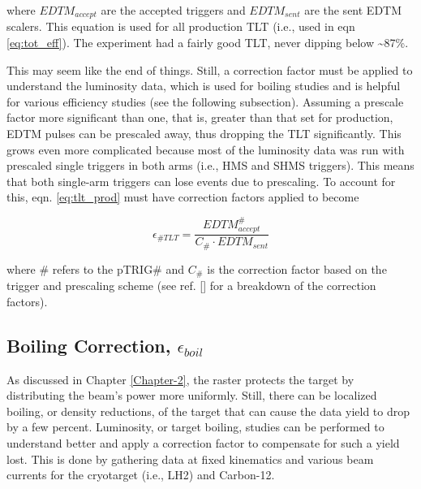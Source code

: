 \documentclass[
]{report}
\begin{document}
\noindent where \(EDTM_{accept}\) are the accepted triggers and
\(EDTM_{sent}\) are the sent EDTM scalers. This equation is used for all
production TLT (i.e., used in eqn \ref{eq:tot_eff}). The experiment had
a fairly good TLT, never dipping below \textasciitilde87\%.



This may seem like the end of things. Still, a correction factor must be
applied to understand the luminosity data, which is used for boiling
studies and is helpful for various efficiency studies (see the following
subsection). Assuming a prescale factor more significant than one, that
is, greater than that set for production, EDTM pulses can be prescaled
away, thus dropping the TLT significantly. This grows even more
complicated because most of the luminosity data was run with prescaled
single triggers in both arms (i.e., HMS and SHMS triggers). This means
that both single-arm triggers can lose events due to prescaling. To
account for this, eqn. \ref{eq:tlt_prod} must have correction factors
applied to become

\begin{equation} 
  \epsilon_{\#TLT}=\frac{EDTM^{\#}_{accept}}{C_{\#}\cdot EDTM_{sent}}
  \label{eq:tlt_prescale} 
\end{equation}

\noindent where \# refers to the pTRIG\# and \(C_{\#}\) is the
correction factor based on the trigger and prescaling scheme (see ref.
{[}\cite{murphy_edtm_2022}{]} for a breakdown of the correction
factors).

\hypertarget{boiling-correction-epsilon_boil}{%
\subsection{\texorpdfstring{Boiling Correction,
\(\epsilon_{boil}\)}{Boiling Correction, \textbackslash epsilon\_\{boil\}}}\label{boiling-correction-epsilon_boil}}

As discussed in Chapter \ref{Chapter-2}, the raster protects the target
by distributing the beam's power more uniformly. Still, there can be
localized boiling, or density reductions, of the target that can cause
the data yield to drop by a few percent. Luminosity, or target boiling,
studies can be performed to understand better and apply a correction
factor to compensate for such a yield lost. This is done by gathering
data at fixed kinematics and various beam currents for the cryotarget
(i.e., LH2) and Carbon-12.
\end{document}
